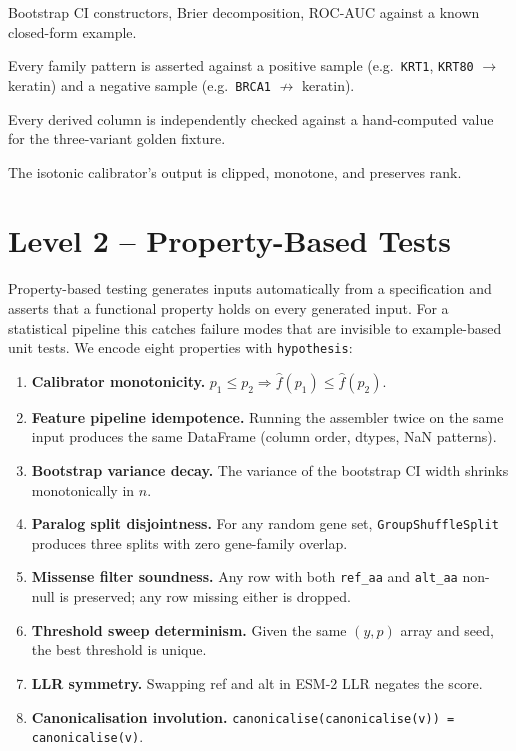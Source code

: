 \documentclass[11pt,a4paper,oneside]{report}
\begin{document}
\begin{description}[leftmargin=1.6em, itemsep=0.15em]
\item[Metric math.] Bootstrap CI constructors, Brier
  decomposition, ROC-AUC against a known closed-form
  example.
\item[Paralog regex.] Every family pattern is asserted
  against a positive sample (e.g.\ \texttt{KRT1},
  \texttt{KRT80} $\to$ keratin) and a negative sample
  (e.g.\ \texttt{BRCA1} $\not\to$ keratin).
\item[Feature assembly.] Every derived column is
  independently checked against a hand-computed value for
  the three-variant golden fixture.
\item[Calibration.] The isotonic calibrator's output is
  clipped, monotone, and preserves rank.
\end{description}

\section{Level 2 -- Property-Based Tests}
\label{sec:test-property}

Property-based testing \citep{maccyber2020hypothesis}
generates inputs automatically from a specification and
asserts that a functional property holds on every
generated input. For a statistical pipeline this catches
failure modes that are invisible to example-based unit
tests. We encode eight properties with
\texttt{hypothesis}:

\begin{enumerate}[leftmargin=1.6em, itemsep=0.15em]
\item \textbf{Calibrator monotonicity.} $p_1 \leq p_2
  \Longrightarrow \hat f(p_1) \leq \hat f(p_2)$.
\item \textbf{Feature pipeline idempotence.} Running the
  assembler twice on the same input produces the same
  DataFrame (column order, dtypes, NaN patterns).
\item \textbf{Bootstrap variance decay.} The variance of
  the bootstrap CI width shrinks monotonically in $n$.
\item \textbf{Paralog split disjointness.} For any random
  gene set, \texttt{GroupShuffleSplit} produces three
  splits with zero gene-family overlap.
\item \textbf{Missense filter soundness.} Any row with
  both \texttt{ref\_aa} and \texttt{alt\_aa} non-null is
  preserved; any row missing either is dropped.
\item \textbf{Threshold sweep determinism.} Given the same
  $(y, p)$ array and seed, the best threshold is unique.
\item \textbf{LLR symmetry.} Swapping ref and alt in
  ESM-2 LLR negates the score.
\item \textbf{Canonicalisation involution.}
  \texttt{canonicalise(canonicalise(v)) = canonicalise(v)}.
\end{enumerate}
\end{document}
